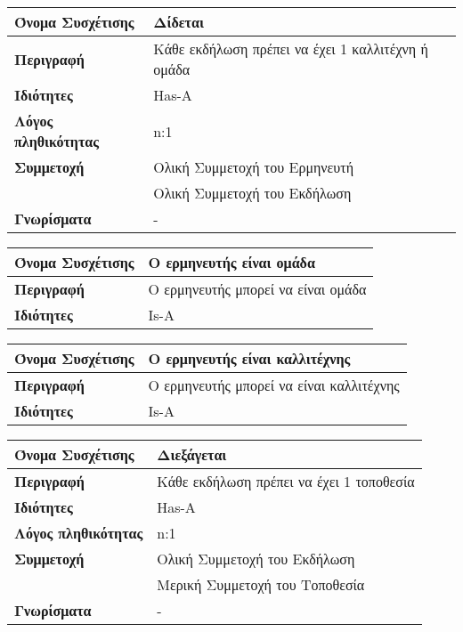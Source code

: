 \begin{center}
\begin{tabular}[]{|p{4cm}|p{10cm}|}
  \hline
  \textbf{Όνομα Συσχέτισης} & Δίδεται \\ \hline
  \textbf{Περιγραφή} & Κάθε εκδήλωση πρέπει να έχει 1 καλλιτέχνη ή ομάδα\\ \hline
  \textbf{Ιδιότητες} & Has-A  \\ \hline
  \textbf{Λόγος πληθικότητας} & n:1 \\ \hline
  \textbf{Συμμετοχή} & Ολική Συμμετοχή του Ερμηνευτή\\ \cline{2-2}
                     & Ολική Συμμετοχή του Εκδήλωση \\ \hline
  \textbf{Γνωρίσματα} & - \\ \hline
\end{tabular}
\vspace{0.3 cm}


\begin{tabular}[]{|p{4cm}|p{10cm}|}
  \hline
  \textbf{Όνομα Συσχέτισης} &Ο ερμηνευτής είναι ομάδα\\ \hline
  \textbf{Περιγραφή} & Ο ερμηνευτής μπορεί να είναι ομάδα\\ \hline
  \textbf{Ιδιότητες} & Is-A  \\ \hline
\end{tabular}
\vspace{0.3 cm}
\begin{tabular}[]{|p{4cm}|p{10cm}|}
  \hline
  \textbf{Όνομα Συσχέτισης} &Ο ερμηνευτής είναι καλλιτέχνης\\ \hline
  \textbf{Περιγραφή} & Ο ερμηνευτής μπορεί να είναι καλλιτέχνης\\ \hline
  \textbf{Ιδιότητες} & Is-A  \\ \hline
\end{tabular}
\vspace{0.3 cm}


\begin{tabular}[]{|p{4cm}|p{10cm}|}
  \hline
  \textbf{Όνομα Συσχέτισης} & Διεξάγεται\\ \hline
  \textbf{Περιγραφή} & Κάθε εκδήλωση πρέπει να έχει 1 τοποθεσία\\ \hline
  \textbf{Ιδιότητες} & Has-A \\ \hline
  \textbf{Λόγος πληθικότητας} & n:1 \\ \hline
  \textbf{Συμμετοχή} & Ολική Συμμετοχή του Εκδήλωση\\ \cline{2-2}
                     & Μερική Συμμετοχή του Τοποθεσία \\ \hline
  \textbf{Γνωρίσματα} & - \\ \hline
\end{tabular}
\vspace{0.3 cm}



\end{center}
